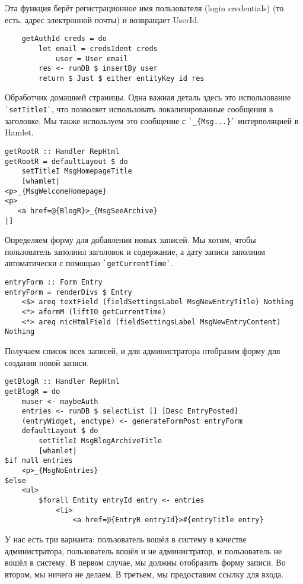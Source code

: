Эта функция берёт регистрационное имя пользователя (login credentials) (то есть, адрес электронной почты) и возвращает UserId. 
 
\begin{lstlisting}
    getAuthId creds = do
        let email = credsIdent creds
            user = User email
        res <- runDB $ insertBy user
        return $ Just $ either entityKey id res
\end{lstlisting}
 
Обработчик домашней страницы. Одна важная деталь здесь это использование \lstinline'`setTitleI`', что позволяет использовать локализированные сообщения в заголовке. Мы также используем это сообщение с \lstinline'`_{Msg...}`' интерполяцией в Hamlet. 
 
\begin{lstlisting}
getRootR :: Handler RepHtml
getRootR = defaultLayout $ do
    setTitleI MsgHomepageTitle
    [whamlet|
<p>_{MsgWelcomeHomepage}
<p>
   <a href=@{BlogR}>_{MsgSeeArchive}
|]
\end{lstlisting}
 
Определяем форму для добавления новых записей. Мы хотим, чтобы пользователь заполнил заголовок и содержание, а дату записи заполним автоматически с помощью \lstinline'`getCurrentTime`'. 
 
\begin{lstlisting}
entryForm :: Form Entry
entryForm = renderDivs $ Entry
    <$> areq textField (fieldSettingsLabel MsgNewEntryTitle) Nothing
    <*> aformM (liftIO getCurrentTime)
    <*> areq nicHtmlField (fieldSettingsLabel MsgNewEntryContent) Nothing
\end{lstlisting}
 
Получаем список всех записей, и для администратора отобразим форму для создания новой записи. 
 
\begin{lstlisting}
getBlogR :: Handler RepHtml
getBlogR = do
    muser <- maybeAuth
    entries <- runDB $ selectList [] [Desc EntryPosted]
    (entryWidget, enctype) <- generateFormPost entryForm
    defaultLayout $ do
        setTitleI MsgBlogArchiveTitle
        [whamlet|
$if null entries
    <p>_{MsgNoEntries}
$else
    <ul>
        $forall Entity entryId entry <- entries
            <li>
                <a href=@{EntryR entryId}>#{entryTitle entry}
\end{lstlisting}
 
У нас есть три варианта: пользователь вошёл в систему в качестве администратора, пользователь вошёл и не администратор, и пользователь не вошёл в систему. В первом случае, мы должны отобразить форму записи. Во втором, мы ничего не делаем. В третьем, мы предоставим ссылку для входа. 
 
